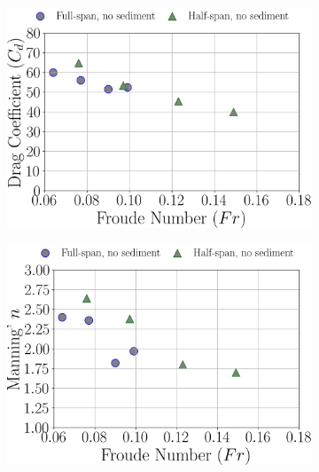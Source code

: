 \documentclass[preview, border=2pt]{standalone}
\begin{document}
\begin{figure}
\begin{subfigure}[b]{0.48\textwidth}
         \includegraphics[width=\textwidth]{Cd_Fr_dependence_no_sediment_cases.png}
     \end{subfigure}
     \hfill     
     \begin{subfigure}[b]{0.48\textwidth}
         \centering
         \caption{}
         \includegraphics[width=\textwidth]{ManningN_Fr_dependence_no_sediment_cases.png}
     \end{subfigure}
\end{figure}
\end{document}
